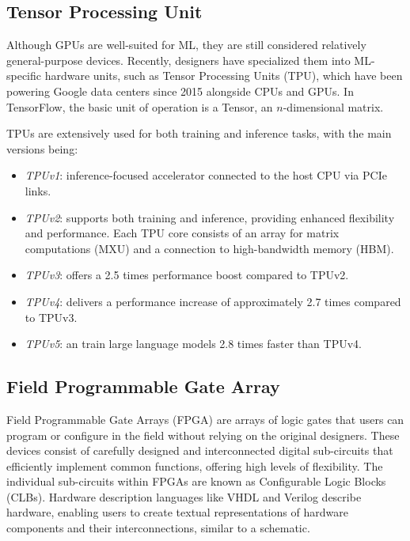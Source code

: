 \subsection{Tensor Processing Unit}
Although GPUs are well-suited for ML, they are still considered relatively general-purpose devices. 
Recently, designers have specialized them into ML-specific hardware units, such as Tensor Processing Units (TPU), which have been powering Google data centers since 2015 alongside CPUs and GPUs. 
In TensorFlow, the basic unit of operation is a Tensor, an $n$-dimensional matrix.

TPUs are extensively used for both training and inference tasks, with the main versions being:
\begin{itemize}
    \item \textit{TPUv1}: inference-focused accelerator connected to the host CPU via PCIe links.
    \item \textit{TPUv2}: supports both training and inference, providing enhanced flexibility and performance. 
        Each TPU core consists of an array for matrix computations (MXU) and a connection to high-bandwidth memory (HBM).
    \item \textit{TPUv3}: offers a 2.5 times performance boost compared to TPUv2.
    \item \textit{TPUv4}: delivers a performance increase of approximately 2.7 times compared to TPUv3.
    \item \textit{TPUv5}: an train large language models 2.8 times faster than TPUv4.
\end{itemize}

\subsection{Field Programmable Gate Array}
Field Programmable Gate Arrays (FPGA) are arrays of logic gates that users can program or configure in the field without relying on the original designers. 
These devices consist of carefully designed and interconnected digital sub-circuits that efficiently implement common functions, offering high levels of flexibility. 
The individual sub-circuits within FPGAs are known as Configurable Logic Blocks (CLBs).
Hardware description languages like VHDL and Verilog describe hardware, enabling users to create textual representations of hardware components and their interconnections, similar to a schematic.

